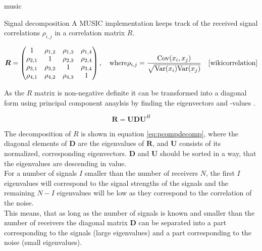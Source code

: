 \begin{subchapter}{\acrshort{music}}
\begin{subsubchapter}{Signal decomposition}
    A MUSIC implementation keeps track of the received signal
    correlations $\rho_{i,j}$ in a correlation matrix $R$.

    \begin{equation}
      \bm{R} =
        \begin{pmatrix}
          1          & \rho_{1,2} & \rho_{1,3} & \rho_{1,4} \\
          \rho_{2,1} &          1 & \rho_{2,3} & \rho_{2,4} \\
          \rho_{3,1} & \rho_{3,2} &          1 & \rho_{3,4} \\
          \rho_{4,1} & \rho_{4,2} & \rho_{4,3} &          1 \\
        \end{pmatrix} , \quad \text{where}
        \rho_{i,j} = \frac{\mathrm{Cov}(x_{i}, x_{j})}{\sqrt{\mathrm{Var}(x_{i})\mathrm{Var}(x_{j})}}
      \quad \text{\cite{wikicorrelation}}
    \end{equation}

    As the $R$ matrix is non-negative definite \cite[p. 9]{girdmusic}
    it can be transformed into a diagonal form using
    principal component anaylsis by finding the eigenvectors and -values
    \cite[p. 325]{bronstein2016}.

    \begin{equation}
      \label{eq:pcompdecomp}
      \bm{R} = \bm{U} \bm{D} \bm{U}^{H}
    \end{equation}

    The decomposition of $R$ is shown in equation \ref{eq:pcompdecomp},
    where the diagonal elements of $\bm{D}$
    are the eigenvalues of $\bm{R}$, and $\bm{U}$
    consists of its normalized, corresponding eigenvectors.
    $\bm{D}$ and $\bm{U}$ should be sorted in a way,
    that the eigenvalues are descending in value. \\

    For a number of signals $I$ smaller than the
    number of receivers $N$, the first $I$ eigenvalues
    will correspond to the signal strengths of the signals
    and the remaining $N - I$ eigenvalues will be low as they
    correspond to the correlation of the noise. \\

    This means, that as long as the number of signals is
    known and smaller than the number of receivers the
    diagonal matrix $\bm{D}$ can be separated into a part
    corresponding to the signals (large eigenvalues) and
    a part corresponding to the noise (small eigenvalues).


\end{subsubchapter}
\end{subchapter}
